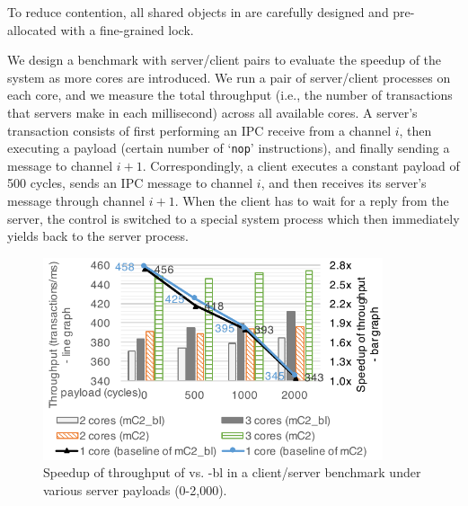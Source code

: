 To reduce contention, all shared objects in {\cCTOS} are carefully
designed and pre-allocated with a fine-grained lock.
We design a benchmark
with server/client pairs to evaluate the speedup of the system as more
cores are introduced.  
We run a pair of server/client processes on each
core, and we measure the total throughput (i.e., the number of
transactions that servers make in each millisecond) across all
available cores.
A server's transaction consists of first performing an IPC receive
from a channel $i$, then executing a payload (certain number of
`\texttt{nop}' instructions), and finally sending a message to channel
$i + 1$. Correspondingly, a client executes a constant payload of 500
cycles, sends an IPC message to channel $i$, and then receives its
server's message through channel $i + 1$.  When the client has to wait
for a reply from the server, the control is switched to a special
system process which then immediately yields back to the server
process.

\begin{figure}\centering
	\hspace{-.2cm}
	\includegraphics[width=10cm]{figs/speedup_big_lock2.pdf}
	\hspace{-.2cm}
	\caption{Speedup of throughput of \cCTOS{} vs. {\cCTOS-bl} in a client/server benchmark under various server payloads (0-2,000).}
	\label{fig:speedup_big_lock}
\end{figure}

